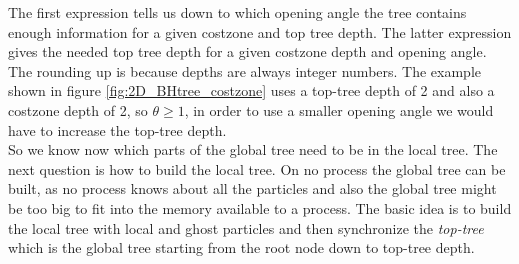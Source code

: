 The first expression tells us down to which opening angle the tree contains enough information for a given costzone and top tree depth. The latter expression gives the needed top tree depth for a given costzone depth and opening angle. The rounding up is because depths are always integer numbers. The example shown in  figure \ref{fig:2D_BHtree_costzone} uses a top-tree depth of 2 and also a costzone depth of 2, so $\theta \ge 1$, in order to use a smaller opening angle we would have to increase the top-tree depth.\\
So we know now which parts of the global tree need to be in the local tree. The next question is how to build the local tree. On no process the global tree can be built, as no process knows about all the particles and also the global tree might be too big to fit into the memory available to a process. The basic idea is to build the local tree with local and ghost particles and then synchronize the \emph{top-tree} which is the global tree starting from the root node down to top-tree depth.
